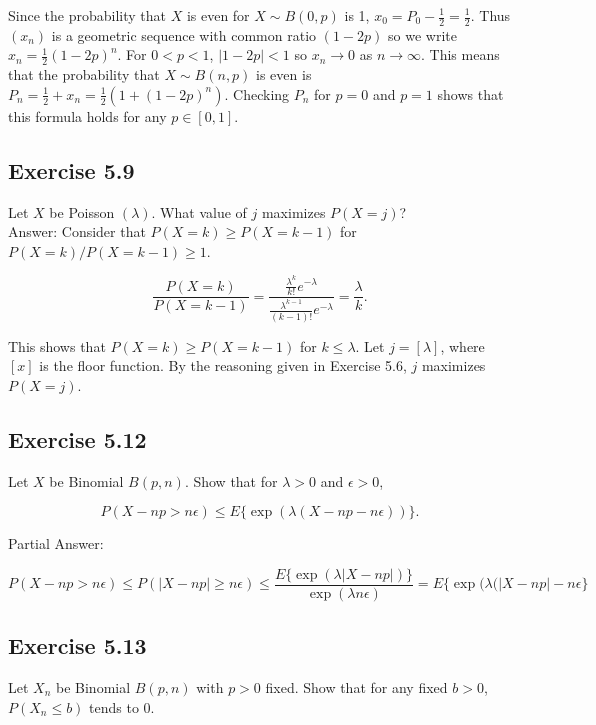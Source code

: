\documentclass{article}
\begin{document}
Since the probability that $X$ is even for $X \sim B(0,p)$ is 1, $x_0 = P_0 - \frac{1}{2} = \frac{1}{2}$. Thus $(x_n)$ is a geometric sequence with common ratio $(1-2p)$ so we write $x_n = \frac{1}{2}(1-2p)^n$. For $0<p<1$, $|1-2p| < 1$ so $x_n \rightarrow 0$ as $n \rightarrow \infty$. This means that the probability that $X \sim B(n,p)$ is even is $P_n = \frac{1}{2} + x_n = \frac{1}{2}(1 +(1-2p)^n)$. Checking $P_n$ for $p = 0$ and $p=1$ shows that this formula holds for any $p \in [0,1]$. 

\subsection*{Exercise 5.9}

Let $X$ be Poisson $(\lambda)$. What value of $j$ maximizes $P(X = j)$?\\

Answer: Consider that $P(X = k) \geq P(X = k-1)$ for $P(X = k) / P(X = k-1) \geq 1$. 

$$
\frac{P(X = k)}{P(X = k-1)} = \frac{\frac{\lambda^k}{k!}e^{-\lambda}}{\frac{\lambda^{k-1}}{(k-1)!}e^{-\lambda}} = \frac{\lambda}{k}.
$$

This shows that $P(X = k) \geq P(X = k-1)$ for $k \leq \lambda$. Let $j = [\lambda]$, where $[x]$ is the floor function. By the reasoning given in Exercise 5.6, $j$ maximizes $P(X = j)$. 

\subsection*{Exercise 5.12}

Let $X$ be Binomial $B(p, n)$. Show that for $\lambda > 0$ and $\epsilon > 0$,

$$
P(X - np > n\epsilon) \leq E\{\exp(\lambda(X - np - n\epsilon))\}.
$$

Partial Answer:

$$
P(X - np > n\epsilon) \leq P(|X - np| \geq n\epsilon)
\leq \frac{E\{\exp(\lambda|X - np|)\}}{\exp(\lambda n\epsilon)}
= E\{\exp(\lambda(|X - np| -n\epsilon \}
$$


\subsection*{Exercise 5.13}

Let $X_n$ be Binomial $B(p, n)$ with $p > 0$ fixed. Show that for any fixed $b > 0$, $P(X_n \leq b)$ tends to 0.\\
\end{document}
